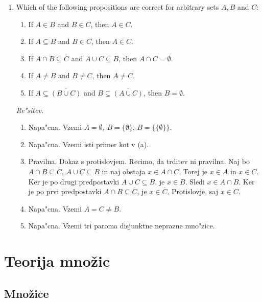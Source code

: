 \documentclass[11pt,paper=b5,footinclude,headinclude]{scrbook} %
\begin{document}
\begin{enumerate}
\item Which of the following propositions are correct for arbitrary sets $A, B$ and $C$:
\begin{enumerate}
\item If $A\in B$ and $B\in C$, then $A\in C$.
\item If $A\subseteq B$ and $B\in C$, then $A\in C$.
\item If $A\cap B\subseteq \overline{C}$ and $A\cup C \subseteq B$, then $A\cap C = \emptyset$.
\item If $A\neq B$ and $B\neq C$, then $A\neq C$.
\item If $A\subseteq \overline{(B\cup C)}$ and $B\subseteq \overline{(A\cup C)}$, then $B=\emptyset$.
\end{enumerate}

\emph{ Re"sitev.}
\begin{enumerate}
\item Napa"cna. Vzemi $A=\emptyset$, $B=\{\emptyset\}$, $B=\{\{\emptyset\}\}$.
\item Napa"cna. Vzemi isti primer kot v (a).
\item Pravilna. Dokaz s protislovjem. Recimo, da trditev ni pravilna. Naj bo $A\cap B\subseteq \overline{C}$, $A\cup C\subseteq B$  in naj obstaja $x\in A\cap C$. Torej je $x\in A$ in $x\in C$. Ker je po drugi predpostavki $A\cup C\subseteq B$, je $x\in B$. Sledi $x\in A \cap B$. Ker je po prvi predpostavki $A\cap B\subseteq \overline{C}$, je $x\in \overline{C}$. Protislovje, saj $x\in C$. 
\item Napa"cna. Vzemi $A=C\neq B$.
\item Napa"cna. Vzemi tri paroma disjunktne neprazne mno"zice.
\end{enumerate}

\end{enumerate}

\chapter{Teorija množic}

\section{Množice}
\end{document}
